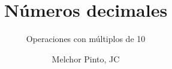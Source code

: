 \documentclass{guia}
\title{Números decimales}
\subtitle{Operaciones con múltiplos de 10}
\author{Melchor Pinto, JC}
\begin{document}
%
\begin{questions}
\questionboxed{}
\end{questions}
\end{document}
